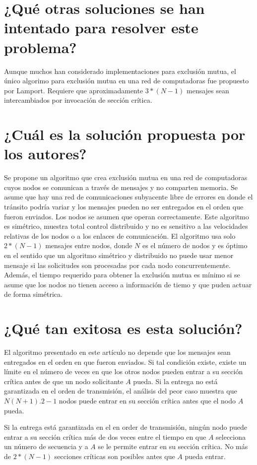 \section{¿Qué otras soluciones se han intentado para resolver este problema?}
Aunque muchos han considerado implementaciones para exclusión mutua, el único algorimo para exclusión mutua en una red de computadoras fue propuesto por Lamport. Requiere que aproximadamente $3 * (N - 1)$ mensajes sean intercambiados por invocación de sección crítica. 
     
\section{¿Cuál es la solución propuesta por los autores?}
Se propone un algoritmo que crea exclusión mutua en una red de computadoras cuyos nodos se comunican a través de mensajes y no comparten memoria. Se asume que hay una red de comunicaciones subyacente libre de errores en donde el tránsito podría variar y los mensajes pueden no ser entregados en el orden que fueron enviados. Los nodos se asumen que operan correctamente. Este algoritmo es simétrico, muestra total control distribuido y no es sensitivo a las velocidades relativas de los nodos o a los enlaces de comunicación. El algoritmo usa solo $2*(N-1)$ mensajes entre nodos, donde $N$ es el número de nodos y es óptimo en el sentido que un algoritmo simétrico y distribuido no puede usar menor mensaje si las solicitudes son procesadas por cada nodo concurrentemente. Además, el tiempo requerido para obtener la exclusión mutua es mínimo si se asume que los nodos no tienen acceso a información de tiemo y que puden actuar de forma simétrica.

\section{¿Qué tan exitosa es esta solución?} 
El algoritmo presentado en este artículo no depende que los mensajes sean entregados en el orden en que fueron enviados. Si tal condición existe, existe un límite en el número de veces en que los otros nodos pueden entrar a su sección crítica antes de que un nodo solicitante $A$ pueda. Si la entrega no está garantizada en el orden de transmisión, el análisis del peor caso muestra que $N(N + 1).2 - 1$ nodos puede entrar en su sección crítica antes que el nodo $A$ pueda. 

Si la entrega está garantizada en el en order de transmisión, ningún nodo puede entrar a su sección crítica más de dos veces entre el tiempo en que $A$ selecciona un número de secuencia y a $A$ se le permite entrar en su sección crítica. No más de $2 * (N - 1)$ secciones críticas son posibles antes que $A$ pueda entrar.

